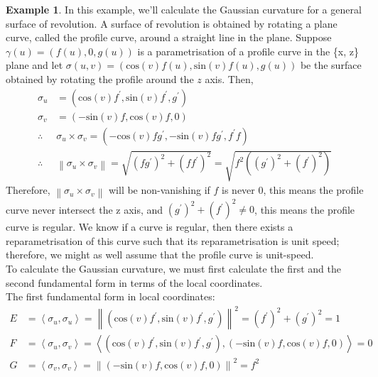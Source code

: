 \documentclass{article}
\theoremstyle{plain}
\theoremstyle{definition}
\newtheorem{example}{Example}
\theoremstyle{remark}
\begin{document}
\begin{example} \label{eg: Gaussian curvature of surface of revolution}
    In this example, we'll calculate the Gaussian curvature for a general surface of revolution. A surface of revolution is obtained by rotating a plane curve, called the profile curve, around a straight line in the plane. Suppose \( \gamma(u) = (f(u),0,g(u))\) is a parametrisation of a profile curve in the \{x, z\} plane and let \( \sigma(u,v) = (\text{cos}(v)f(u), \text{sin}(v)f(u), g(u) )\) be the surface obtained by rotating the profile around the \(z\) axis. Then, 
    \begin{align*}
        \sigma_u & = (\text{cos}(v)f^{\prime}, \text{sin}(v)f^{\prime}, g^{\prime} ) \\
        \sigma_v & = (-\text{sin}(v)f, \text{cos}(v)f, 0) \\
        \therefore \; \; & \sigma_u \times \sigma_v = (-\text{cos}(v)fg^{\prime} , -\text{sin}(v)fg^{\prime}, f^{\prime} f) \\
        \therefore \; \; &  \left\lVert\sigma_u \times \sigma_v \right\rVert = \sqrt{(fg^{\prime})^2 + (ff^{\prime})^2} = \sqrt{f^2((g^{\prime})^2 + (f^{\prime})^2)}
    \end{align*} 
    Therefore, \( \left\lVert\sigma_u \times \sigma_v \right\rVert \) will be non-vanishing if \( f \) is never \(0\), this means the profile curve never intersect the z axis, and \(  (g^{\prime})^2 + (f^{\prime})^2 \neq 0 \), this means the profile curve is regular. We know if a curve is regular, then there exists a reparametrisation of this curve such that its reparametrisation is unit speed; therefore, we might as well assume that the profile curve is unit-speed. \\
    To calculate the Gaussian curvature, we must first calculate the first and the second fundamental form in terms of the local coordinates. \\
    The first fundamental form in local coordinates: 
    \begin{align*}
        E & = \left\langle \sigma_u , \sigma_u\right\rangle  = \left\lVert (\text{cos}(v)f^{\prime}, \text{sin}(v)f^{\prime}, g^{\prime} ) \right\rVert^2 = (f^{\prime})^2 + (g^{\prime})^2  = 1 \\
        F & = \left\langle \sigma_u, \sigma_v \right\rangle = \left\langle (\text{cos}(v)f^{\prime}, \text{sin}(v)f^{\prime}, g^{\prime} ), (-\text{sin}(v)f, \text{cos}(v)f, 0 ) \right\rangle = 0 \\
        G & = \left\langle \sigma_v, \sigma_v \right\rangle  = \left\lVert (-\text{sin}(v)f, \text{cos}(v)f, 0) \right\rVert ^2 = f^2

\end{align*}
\end{example}
\end{document}
